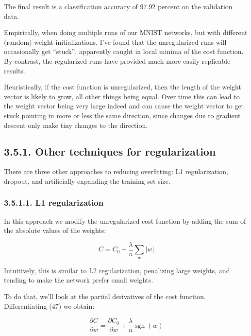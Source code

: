 \documentclass[12 pt]{article}
\begin{document}
The final result is a classification accuracy of $ 97.92 $ percent on
the validation data.

Empirically, when doing multiple runs of our MNIST networks, but with
different (random) weight initializations, I've found that the
unregularized runs will occasionally get ``stuck'', apparently caught in
local minima of the cost function. By contrast, the regularized runs
have provided much more easily replicable results.

Heuristically, if the cost function is unregularized, then the length of
the weight vector is likely to grow, all other things being equal. Over
time this can lead to the weight vector being very large indeed and can
cause the weight vector to get stuck pointing in more or less the same
direction, since changes due to gradient descent only make tiny changes
to the direction.

\subsection{3.5.1. Other techniques for regularization}
\label{other-techniques-for-regularization}

There are three other approaches to reducing overfitting: L1
regularization, dropout, and artificially expanding the training set
size.

\subsubsection{3.5.1.1. L1 regularization}\label{l1-regularization}

In this approach we modify the unregularized cost function by adding the
sum of the absolute values of the weights:

\begin{equation}
    C = C_0 + \frac{\lambda}{n} \sum_w |w|
\end{equation}

Intuitively, this is similar to L2 regularization, penalizing large
weights, and tending to make the network prefer small weights.

To do that, we'll look at the partial derivatives of the cost function.
Differentiating (47) we obtain:

\newcommand{\sgn}{\mathop{\mathrm{sgn}}}
\begin{equation}
    \frac{\partial C}{\partial w} = \frac{\partial C_0}{\partial w} +
    \frac{\lambda}{n} \sgn(w)
\end{equation}
\end{document}
